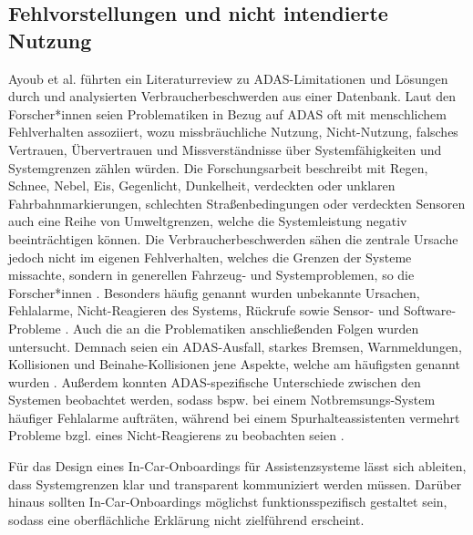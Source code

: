 \subsection{Fehlvorstellungen und nicht intendierte Nutzung}
\label{subsec:fehlvorstellungen_fehlgebrauch}
Ayoub et al. \cite{ayoub2022cause} führten ein Literaturreview zu ADAS-Limitationen und Lösungen durch und analysierten Verbraucherbeschwerden aus einer Datenbank. Laut den Forscher*innen \cite{ayoub2022cause} seien Problematiken in Bezug auf ADAS oft mit menschlichem Fehlverhalten assoziiert, wozu missbräuchliche Nutzung, Nicht-Nutzung, falsches Vertrauen, Übervertrauen und Missverständnisse über Systemfähigkeiten und Systemgrenzen zählen würden. Die Forschungsarbeit \cite{ayoub2022cause} beschreibt mit Regen, Schnee, Nebel, Eis, Gegenlicht, Dunkelheit, verdeckten oder unklaren Fahrbahnmarkierungen, schlechten Straßenbedingungen oder verdeckten Sensoren auch eine Reihe von Umweltgrenzen, welche die Systemleistung negativ beeinträchtigen können. Die Verbraucherbeschwerden sähen die zentrale Ursache jedoch nicht im eigenen Fehlverhalten, welches die Grenzen der Systeme missachte, sondern in generellen Fahrzeug- und Systemproblemen, so die Forscher*innen \cite{ayoub2022cause}. Besonders häufig genannt wurden unbekannte Ursachen, Fehlalarme, Nicht-Reagieren des Systems, Rückrufe sowie Sensor- und Software-Probleme \cite{ayoub2022cause}. Auch die an die Problematiken anschließenden Folgen wurden untersucht. Demnach seien ein ADAS-Ausfall, starkes Bremsen, Warnmeldungen, Kollisionen und Beinahe-Kollisionen jene Aspekte, welche am häufigsten genannt wurden \cite{ayoub2022cause}. Außerdem konnten ADAS-spezifische Unterschiede zwischen den Systemen beobachtet werden, sodass bspw. bei einem Notbremsungs-System häufiger Fehlalarme aufträten, während bei einem Spurhalteassistenten vermehrt Probleme bzgl. eines Nicht-Reagierens zu beobachten seien \cite{ayoub2022cause}. 

Für das Design eines In-Car-Onboardings für Assistenzsysteme lässt sich ableiten, dass Systemgrenzen klar und transparent kommuniziert werden müssen. Darüber hinaus sollten In-Car-Onboardings möglichst funktionsspezifisch gestaltet sein, sodass eine oberflächliche Erklärung nicht zielführend erscheint.

